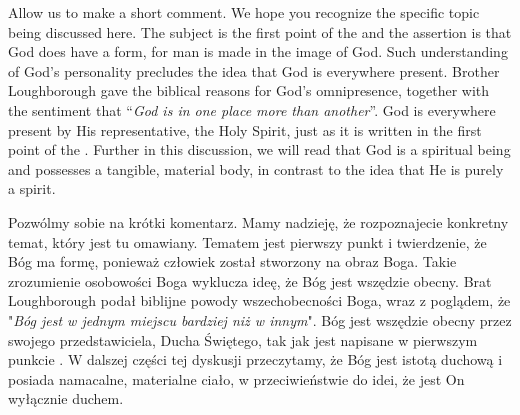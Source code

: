 

Allow us to make a short comment. We hope you recognize the specific topic being discussed here. The subject is the first point of the  and the assertion is that God does have a form, for man is made in the image of God. Such understanding of God’s personality precludes the idea that God is everywhere present. Brother Loughborough gave the biblical reasons for God's omnipresence, together with the sentiment that “\textit{God is in one place more than another}”. God is everywhere present by His representative, the Holy Spirit, just as it is written in the first point of the . Further in this discussion, we will read that God is a spiritual being and possesses a tangible, material body, in contrast to the idea that He is purely a spirit.


Pozwólmy sobie na krótki komentarz. Mamy nadzieję, że rozpoznajecie konkretny temat, który jest tu omawiany. Tematem jest pierwszy punkt  i twierdzenie, że Bóg ma formę, ponieważ człowiek został stworzony na obraz Boga. Takie zrozumienie osobowości Boga wyklucza ideę, że Bóg jest wszędzie obecny. Brat Loughborough podał biblijne powody wszechobecności Boga, wraz z poglądem, że "\textit{Bóg jest w jednym miejscu bardziej niż w innym}". Bóg jest wszędzie obecny przez swojego przedstawiciela, Ducha Świętego, tak jak jest napisane w pierwszym punkcie . W dalszej części tej dyskusji przeczytamy, że Bóg jest istotą duchową i posiada namacalne, materialne ciało, w przeciwieństwie do idei, że jest On wyłącznie duchem.


